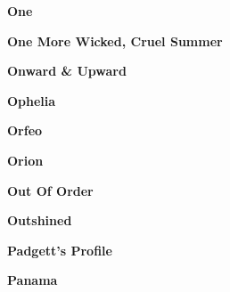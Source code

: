 \newline
\vspace{10pt} 
\begin{center}\textbf{One}\end{center}
\newline
\vspace{10pt} 
\begin{center}\textbf{One More Wicked, Cruel Summer}\end{center}
\newline
\vspace{10pt} 
\begin{center}\textbf{Onward \& Upward}\end{center}
\newline
\vspace{10pt} 
\begin{center}\textbf{Ophelia}\end{center}
\newline
\vspace{10pt} 
\begin{center}\textbf{Orfeo}\end{center}
\newline
\vspace{10pt} 
\begin{center}\textbf{Orion}\end{center}
\newline
\vspace{10pt} 
\begin{center}\textbf{Out Of Order}\end{center}
\newline
\vspace{10pt} 
\begin{center}\textbf{Outshined}\end{center}
\newline
\vspace{10pt} 
\begin{center}\textbf{Padgett's Profile}\end{center}
\newline
\vspace{10pt} 
\begin{center}\textbf{Panama}\end{center}
